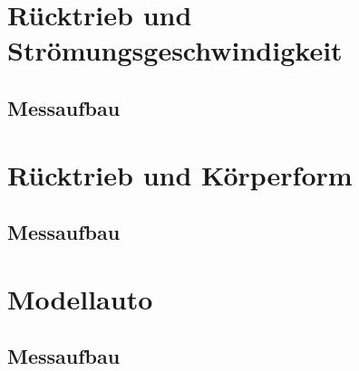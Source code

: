 \section{Rücktrieb und Strömungsgeschwindigkeit}
\subsection{Messaufbau}

\section{Rücktrieb und Körperform}
\subsection{Messaufbau}

\section{Modellauto}
\subsection{Messaufbau}